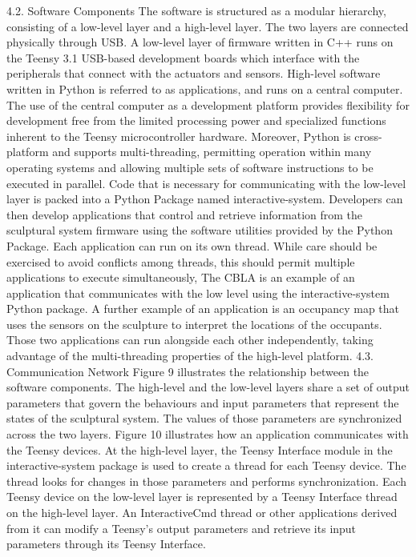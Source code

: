 4.2. Software Components
The software is structured as a modular hierarchy, consisting of a low-level layer and a high-level layer. The two layers are connected physically through USB. A low-level layer of firmware written in C++ runs on the Teensy 3.1 USB-based development boards which interface with the peripherals that connect with the actuators and sensors.  High-level software written in Python is referred to as applications, and runs on a central computer. The use of the central computer as a development platform provides flexibility for development free from the limited processing power and specialized functions inherent to the Teensy microcontroller hardware. Moreover, Python is cross-platform and supports multi-threading, permitting operation within many operating systems and allowing multiple sets of software instructions to be executed in parallel. Code that is necessary for communicating with the low-level layer is packed into a Python Package named interactive-system. Developers can then develop applications that control and retrieve information from the sculptural system firmware using the software utilities provided by the Python Package. Each application can run on its own thread. While care should be exercised to avoid conflicts among threads, this should permit multiple applications to execute simultaneously, 	
The CBLA is an example of an application that communicates with the low level using the interactive-system Python package. A further example of an application is an occupancy map that uses the sensors on the sculpture to interpret the locations of the occupants. Those two applications can run alongside each other independently, taking advantage of the multi-threading properties of the high-level platform.
4.3. Communication Network
Figure 9 illustrates the relationship between the software components. The high-level and the low-level layers share a set of output parameters that govern the behaviours and input parameters that represent the states of the sculptural system. The values of those parameters are synchronized across the two layers. Figure 10 illustrates how an application communicates with the Teensy devices. At the high-level layer, the Teensy Interface module in the interactive-system package is used to create a thread for each Teensy device. The thread looks for changes in those parameters and performs synchronization. Each Teensy device on the low-level layer is represented by a Teensy Interface thread on the high-level layer. An InteractiveCmd thread or other applications derived from it can modify a Teensy’s output parameters and retrieve its input parameters through its Teensy Interface.

